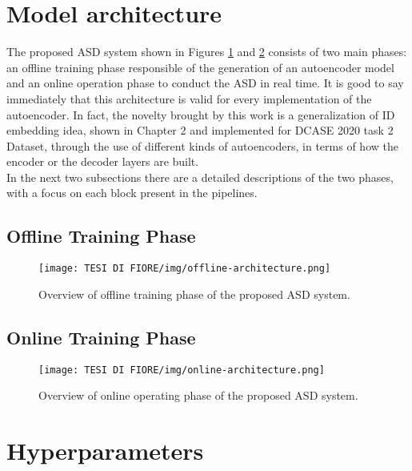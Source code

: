 \section{Model architecture}
The proposed ASD system shown in Figures \ref{offline-asd-system} and \ref{online-asd-system} consists of two main phases: an offline training phase responsible of the generation of an autoencoder model and an online operation phase to conduct the ASD in real time. It is good to say immediately that this architecture is valid for every implementation of the autoencoder. In fact, the novelty brought by this work is a generalization of ID embedding idea, shown in Chapter 2 and implemented for DCASE 2020 task 2 Dataset, through the use of different kinds of autoencoders, in terms of how the encoder or the decoder layers are built.\\
In the next two subsections there are a detailed descriptions of the two phases, with a focus on each block present in the pipelines.

\subsection{Offline Training Phase}
\begin{figure}[ht]
\texttt{[image: TESI DI FIORE/img/offline-architecture.png]}
\centering
\caption{Overview of offline training phase of the proposed ASD system.}
\label{offline-asd-system}
\end{figure}



\subsection{Online Training Phase}
\begin{figure}[ht]
\texttt{[image: TESI DI FIORE/img/online-architecture.png]}
\centering
\caption{Overview of online operating phase of the proposed ASD system.}
\label{online-asd-system}
\end{figure}

\section{Hyperparameters}

